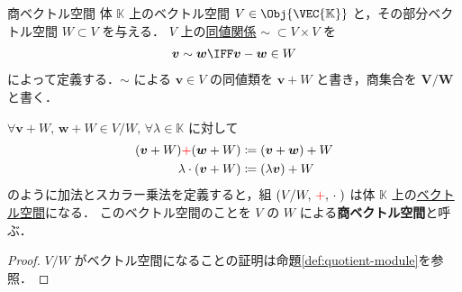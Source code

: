 \documentclass[geometry_main]{subfiles}
\begin{document}
\begin{myprop}[label=prop:quotient-vec]{商ベクトル空間}
	体 $\mathbb{K}$ 上のベクトル空間 $V \in \Obj{\VEC{\mathbb{K}}}$ と，その部分ベクトル空間 $W \subset V$ を与える．
	$V$ 上の\hyperref[ax.eq]{同値関係} $\sim\; \subset V \times V$ を
	\begin{align}
		\bm{v} \sim \bm{w} \IFF \bm{v} - \bm{w} \in W
	\end{align}
	によって定義する．$\sim$ による $\bm{v} \in V$ の同値類を $\bm{v} + W$ と書き，商集合を $\bm{V/W}$ と書く．

	$\forall \bm{v} + W,\, \bm{w} + W \in V/W,\, \forall \lambda \in \mathbb{K}$ に対して
	\begin{align}
		(\bm{v} + W) \textcolor{red}{+} (\bm{w} + W) &\coloneqq (\bm{v} + \bm{w}) + W \\
		\lambda \cdot (\bm{v} + W) &\coloneqq (\lambda\bm{v}) + W
	\end{align}
	のように加法とスカラー乗法を定義すると，組 $(V/W,\, \textcolor{red}{+},\, \cdot \;)$ は体 $\mathbb{K}$ 上の\hyperref[ax.vector]{ベクトル空間}になる．
	このベクトル空間のことを $V$ の $W$ による\textbf{商ベクトル空間}と呼ぶ．
\end{myprop}

\begin{proof}
	$V/W$ がベクトル空間になることの証明は命題\ref{def:quotient-module}を参照．
\end{proof}

\end{document}
